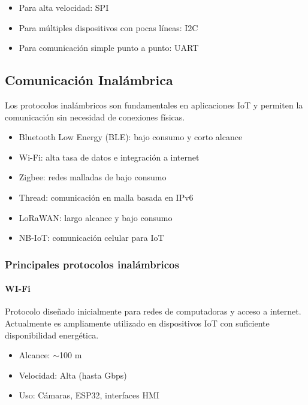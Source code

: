 \documentclass[conference]{IEEEtran}
\begin{document}
\begin{itemize}
    \item Para alta velocidad: SPI
    \item Para múltiples dispositivos con pocas líneas: I2C
    \item Para comunicación simple punto a punto: UART
\end{itemize}

\subsection{Comunicación Inalámbrica}

Los protocolos inalámbricos son fundamentales en aplicaciones IoT y permiten la comunicación sin necesidad de conexiones físicas.

\begin{itemize}
    \item Bluetooth Low Energy (BLE): bajo consumo y corto alcance
    \item Wi-Fi: alta tasa de datos e integración a internet
    \item Zigbee: redes malladas de bajo consumo
    \item Thread: comunicación en malla basada en IPv6
    \item LoRaWAN: largo alcance y bajo consumo
    \item NB-IoT: comunicación celular para IoT
\end{itemize}

\subsubsection{Principales protocolos inalámbricos}

\paragraph{\textbf{WI-Fi}}

Protocolo diseñado inicialmente para redes de computadoras y acceso a internet. Actualmente es ampliamente utilizado en dispositivos IoT con suficiente disponibilidad energética.

\begin{itemize}
    \item Alcance: $\sim$100 m
    \item Velocidad: Alta (hasta Gbps)
    \item Uso: Cámaras, ESP32, interfaces HMI
\end{itemize}
\end{document}
